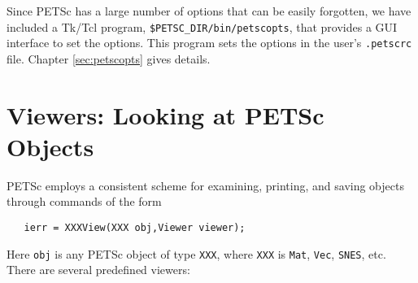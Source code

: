 Since PETSc has a large number of options that can be easily forgotten,
we have included a Tk/Tcl program, {\tt \$PETSC\_DIR/bin/petscopts}, that
provides a GUI interface to set the options.  This program sets
the options in the user's {\tt .petscrc} file. 
Chapter \ref{sec:petscopts} gives details.

\section{Viewers: Looking at PETSc Objects} \label{sec:viewers}

PETSc employs a consistent scheme for examining, printing, and 
saving objects through commands of the form
\begin{verbatim}
   ierr = XXXView(XXX obj,Viewer viewer);
\end{verbatim}
Here {\tt obj} is any PETSc object of type
{\tt XXX},  where {\tt XXX} 
is {\tt Mat}, {\tt Vec}, {\tt SNES}, etc. There are several
predefined viewers:
